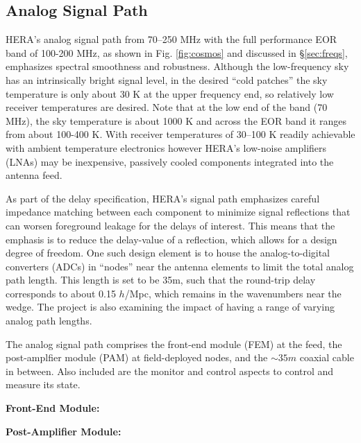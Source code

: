\documentclass[preprint,11pt]{aastex}
\begin{document}
\subsection{Analog Signal Path}
\label{sec:analog}
HERA's analog signal path from 70--250 MHz with the full performance EOR band of 100-200 MHz, as shown in Fig. \ref{fig:cosmos} and discussed in \S\ref{sec:freqs}, emphasizes spectral smoothness and robustness.  Although the low-frequency sky has an intrinsically bright signal level, in the desired ``cold patches'' the sky temperature is only about 30 K at the upper frequency end, so relatively low receiver temperatures are desired.  Note that at the low end of the band (70 MHz), the sky temperature is about 1000 K and across the EOR band it ranges from about 100-400 K.
With receiver temperatures of 30--100 K readily achievable with ambient temperature electronics however
HERA's low-noise amplifiers (LNAs) may be inexpensive, passively cooled components integrated into the
antenna feed.  

As part of the delay specification,
HERA's signal path emphasizes careful impedance matching between each component to minimize signal reflections that can worsen foreground leakage for the delays of interest.  This means that the emphasis is to reduce the delay-value of a reflection, which allows for a design degree of freedom.  One such design element is to 
house the analog-to-digital converters (ADCs) in ``nodes'' near the antenna elements
to limit the total analog path length.  This length is set to be 35m, such that the round-trip delay corresponds to about 0.15 $h$/Mpc, which remains in the wavenumbers  near the wedge.  The project is also examining the impact of having a range of varying analog path lengths.

The analog signal path comprises the front-end module (FEM) at the feed, the post-amplfier module (PAM) at field-deployed nodes, and the $\sim 35m$ coaxial cable in between.  Also included are the monitor and control aspects to control and measure its state.

{\bf Front-End Module: }

{\bf Post-Amplifier Module: }
\end{document}
